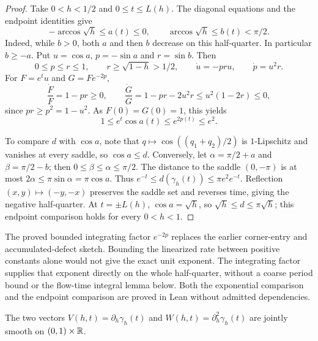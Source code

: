 \begin{proof}
\leanok
Take $0<h<1/2$ and $0\le t\le L(h)$. The diagonal equations and the
endpoint identities give
\[
  -\arccos\sqrt h\le a(t)\le0,\qquad
  \arccos\sqrt h\le b(t)<\pi/2.
\]
Indeed, while $b>0$, both $a$ and then $b$ decrease on this
half-quarter. In particular $b\ge-a$. Put
$u=\cos a$, $p=-\sin a$ and $r=\sin b$. Then
\[
  0\le p\le r\le1,\qquad r\ge\sqrt{1-h}>1/2,\qquad
  \dot u=-pru,\qquad \dot p=u^2r.
\]
For $F=e^t u$ and $G=F e^{-2p}$,
\[
  \frac{\dot F}{F}=1-pr\ge0,\qquad
  \frac{\dot G}{G}=1-pr-2u^2r
    \le u^2(1-2r)\le0,
\]
since $pr\ge p^2=1-u^2$. As $F(0)=G(0)=1$, this yields
\[
  1\le e^t\cos a(t)\le e^{2p(t)}\le e^2.
\]

To compare $d$ with $\cos a$, note that
$q\mapsto\cos((q_1+q_2)/2)$ is $1$-Lipschitz and vanishes at every
saddle, so $\cos a\le d$. Conversely, let
$\alpha=\pi/2+a$ and $\beta=\pi/2-b$; then
$0\le\beta\le\alpha\le\pi/2$. The distance to the saddle $(0,-\pi)$
is at most $2\alpha\le\pi\sin\alpha=\pi\cos a$.
Thus $e^{-t}\le d(\gamma_h(t))\le\pi e^2e^{-t}$.
Reflection $(x,y)\mapsto(-y,-x)$ preserves the saddle set and reverses
time, giving the negative half-quarter. At $t=\pm L(h)$,
$\cos a=\sqrt h$, so $\sqrt h\le d\le\pi\sqrt h$; this endpoint
comparison holds for every $0<h<1$.
\end{proof}

\begin{remark}
The proved bounded integrating factor $e^{-2p}$ replaces the earlier
corner-entry and accumulated-defect sketch. Bounding the linearized
rate between positive constants alone would not give the exact unit
exponent. The integrating factor supplies that exponent directly on
the whole half-quarter, without a coarse period bound or the flow-time
integral lemma below. Both the exponential comparison and the endpoint
comparison are proved in Lean without admitted dependencies.
\end{remark}

\begin{lemma}
\label{lem:orbit-level-vectors-smooth}
\leanok
The two vectors
$V(h,t)=\partial_h\gamma_h(t)$ and $W(h,t)=\partial_h^2\gamma_h(t)$
are jointly smooth on $(0,1)\times\mathbb{R}$.
\end{lemma}

